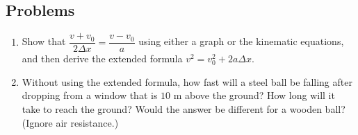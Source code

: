 \documentclass[]{article}
\begin{document}
\subsection{Problems}
\begin{enumerate}
	\item Show that $\dfrac{v+v_0}{2\Delta x} =\dfrac{v-v_0}{a}$ using either a graph or the kinematic equations, and then derive the extended formula $v^2 = v_0^2 + 2a\Delta x$.

	\item Without using the extended formula, how fast will a steel ball be falling after dropping from a window that is $10$ m above the ground? How long will it take to reach the ground? Would the answer be different for a wooden ball? (Ignore air resistance.)
\end{enumerate}
\end{document}
